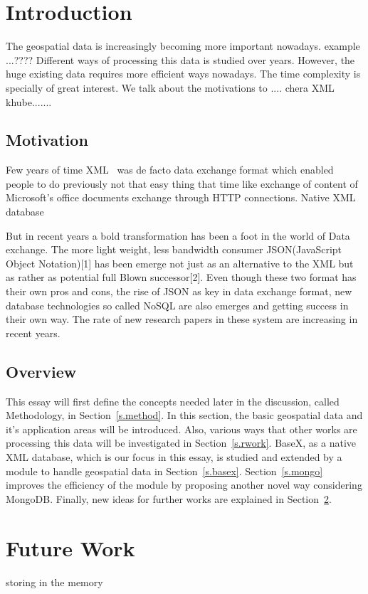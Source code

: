 \documentclass[a4paper,12pt]{article}
\begin{document}
\newpage
\tableofcontents

\thispagestyle{empty}
\newpage
\section{Introduction}
\setcounter{page}{1}
The geospatial data is increasingly becoming more important nowadays. example ...????
Different ways of processing this data is studied over years. However, the huge existing data requires more efficient ways nowadays. The time complexity is specially of great interest. We talk about the motivations to ....
chera XML khube.......

\subsection{Motivation}
Few years of time XML~\cite{www/xml} was  de facto data exchange format which enabled people to do previously not that easy thing that time like exchange of content of Microsoft's office documents exchange through HTTP connections. Native XML database 

But in recent years a bold transformation has been a foot in the world of Data exchange. The more light weight, less bandwidth consumer JSON(JavaScript Object Notation)[1] has been emerge not just as an alternative to the XML but as rather as potential full Blown successor[2]. Even though these two format has their own pros and cons, the rise of JSON as key in data exchange format, new database technologies so called NoSQL  are also emerges and getting success in their own way. The rate of new research papers in these system are increasing in recent years. 

\subsection{Overview}
This essay will first define the concepts needed later in the discussion, called
Methodology, in Section~\ref{s.method}. In this section, the basic geospatial data
and it's application areas will be introduced. Also, various ways that other works
are processing this data will be investigated in Section~\ref{s.rwork}. BaseX,
as a native XML database, which is our focus in this essay, is studied and extended
by a module to handle geospatial data in Section~\ref{s.basex}. 
Section~\ref{s.mongo} improves the efficiency of the module
by proposing another novel way considering MongoDB.
Finally, new ideas for further works are explained in
Section~\ref{s.future}.

\newpage
\section{Future Work}
\label{s.future}
storing in the memory
\newpage


\newpage
\listoffigures
\newpage
\listoftables
\newpage
\lstlistoflistings
\end{document}
